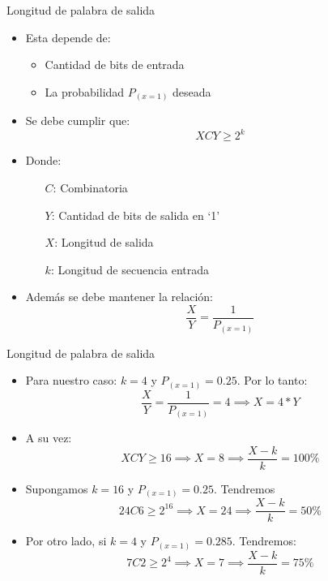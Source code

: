 \documentclass[xcolor=table]{beamer}
\begin{document}
\begin{frame}{Longitud de palabra de salida}
\begin{itemize}
\item Esta depende de: 
\begin{itemize}
    \item  Cantidad de bits de entrada
    \item La probabilidad $P_{(x=1)}$ deseada
\end{itemize}
    \item Se debe cumplir que:
        \begin{equation*}
        XCY \geq 2^{k}    
        \end{equation*}
    \item Donde:
        \begin{itemize}
            \item [$C$:]  Combinatoria
            \item [$Y$:]  Cantidad de bits de salida en `1'
            \item [$X$:] Longitud de salida
            \item[$k$:]  Longitud de secuencia entrada 
        \end{itemize}
    \item Además se debe mantener la relación:
        \begin{equation*}
        \frac{X}{Y} =  \frac{1}{P_{(x=1)}}  
        \end{equation*}
    
    
    \end{itemize}
\end{frame}

\begin{frame}{Longitud de palabra de salida}
    \begin{itemize}
        \item Para nuestro caso: $k=4$ y $P_{(x=1)} = 0.25$. Por lo tanto:
            \begin{equation*}
            \frac{X}{Y} = \frac{1}{P_{(x=1)}} = 4 \implies X = 4*Y
            \end{equation*}
        \item A su vez:
            \begin{equation*} 
            XCY \geq 16 \implies X=8 \implies \frac{X-k}{k} = 100\% 
            \end{equation*}
        \item Supongamos $k=16$ y $P_{(x=1)} = 0.25$. Tendremos
            \begin{equation*} 
            24C6 \geq 2^{16} \implies X=24 \implies \frac{X-k}{k} = 50\% 
            \end{equation*}
        \item Por otro lado, si $k=4$ y $P_{(x=1)} = 0.285$. Tendremos:
            \begin{equation*} 
            7C2 \geq 2^{4} \implies X=7 \implies \frac{X-k}{k} = 75\% 
            \end{equation*}
    \end{itemize}
\end{frame}
\end{document}
